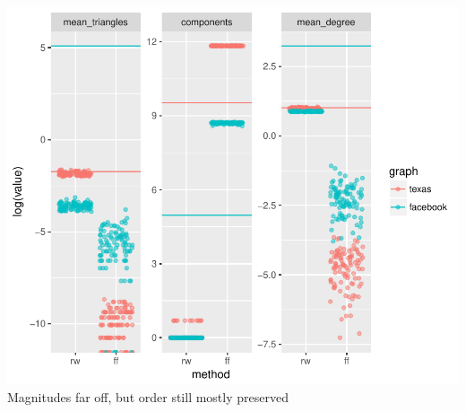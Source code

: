 \documentclass{beamer}
\begin{document}
\begin{frame}
\begin{columns}
\begin{column}[t]{0.6\textwidth}
      \includegraphics[width=\textwidth]{fig/sampled-off}\\
      Magnitudes far off, but order still mostly preserved
    \end{column}
  \end{columns}
\end{frame}


\end{document}
